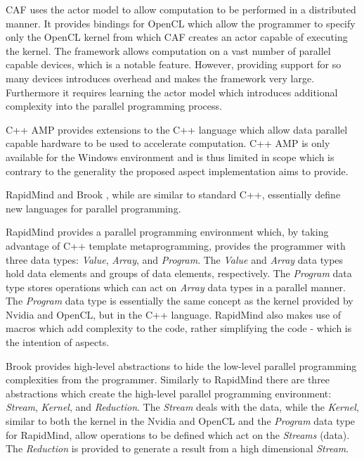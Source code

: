 \documentclass{sig-alternate-05-2015}
\begin{document}
CAF \cite{schmidt:actor} \cite{schmidt:actor1} uses the actor model to allow
computation to be performed in a distributed manner. It provides bindings for
OpenCL which allow the programmer to specify only the OpenCL kernel from which
CAF creates an actor capable of executing the kernel. The framework allows
computation on a vast number of parallel capable devices, which is a notable
feature. However, providing support for so many devices introduces overhead and makes 
the framework very large. Furthermore it requires learning the actor model 
which introduces additional complexity into the parallel programming process.

C++ AMP \cite{microsoft:amp} provides extensions to the C++ language which allow 
data parallel capable hardware to be used to accelerate computation. C++ AMP is 
only available for the Windows environment and is thus limited in scope which is
contrary to the generality the proposed aspect implementation aims to provide.

RapidMind \cite{rapidmind} and Brook \cite{brook}, while are similar to standard
C++, essentially define new languages for parallel programming.

RapidMind provides a parallel programming environment which, by
taking advantage of C++ template metaprogramming, provides the programmer 
with three data types: \textit{Value}, \textit{Array}, and \textit{Program}.
The \textit{Value} and \textit{Array} data types hold data elements and 
groups of data elements, respectively. The \textit{Program} data type stores
operations which can act on \textit{Array} data types in a parallel manner.
The \textit{Program} data type is essentially the same concept as the kernel 
provided  by Nvidia and OpenCL, but in the C++ language. RapidMind also makes 
use of macros which add complexity to the code, rather simplifying the code - 
which is the intention of aspects.

Brook provides high-level abstractions to hide the low-level parallel
programming complexities from the programmer. Similarly to RapidMind there 
are three abstractions which create the high-level parallel programming 
environment: \textit{Stream}, \textit{Kernel}, and \textit{Reduction}. The 
\textit{Stream} deals with the data, while the \textit{Kernel}, similar to both 
the kernel in the Nvidia and OpenCL and the \textit{Program} data type for 
RapidMind, allow operations to be defined which act on the \textit{Streams} (data). 
The \textit{Reduction} is provided to generate a result from a high dimensional 
\textit{Stream}.
\end{document}
